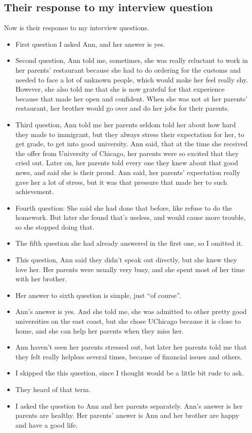 \subsection{Their response to my interview question}
Now is their response to my interview questions.
\begin{itemize}
  \item First question I asked Ann, and her answer is yes.
  \item Second question, Ann told me, sometimes, she was really reluctant to
  work in her parents' restaurant because she had to do ordering for the
  customs and needed to face a lot of unknown people, which would make her feel
  really shy. However, she also told me that she is now grateful for that 
  experience because that made her open and confident. When she was not at her
  parents' restaurant, her brother would go over and do her jobs for their
  parents.
  \item Third question, Ann told me her parents seldom told her about how hard
  they made to immigrant, but they always stress their expectation for her, to
  get grade, to get into good university. Ann said, that at the time she
  received the offer from University of Chicago, her parents were so excited
  that they cried out. Later on, her parents told every one they knew about that
  good news, and said she is their proud. Ann said, her parents' expectation
  really gave her a lot of stress, but it was that pressure that made her to
  such achievement.
  \item Fourth question: She said she had done that before, like refuse to do
  the homework. But later she found that's useless, and would cause more
  trouble, so she stopped doing that.
  \item The fifth question she had already answered in the first one, so I
  omitted it.
  \item This question, Ann said they didn't speak out directly, but she knew
  they love her. Her parents were usually very busy, and she spent most of her
  time with her brother.
  \item Her answer to sixth question is simple, just ``of course''.
  \item Ann's answer is yes. And she told me, she was admitted to other pretty
  good universities on the east coast, but she chose UChicago because it is
  close to home, and she can help her parents when they miss her.
  \item Ann haven't seen her parents stressed out, but later her parents told me
  that they felt really helpless several times, because of financial issues and
  others.
  \item I skipped the this question, since I thought would be a little bit rude
  to ask.
  \item They heard of that term.
  \item I asked the question to Ann and her parents separately. Ann's answer is
  her parents are healthy. Her parents' answer is Ann and her brother
  are happy and have a good life.
\end{itemize}